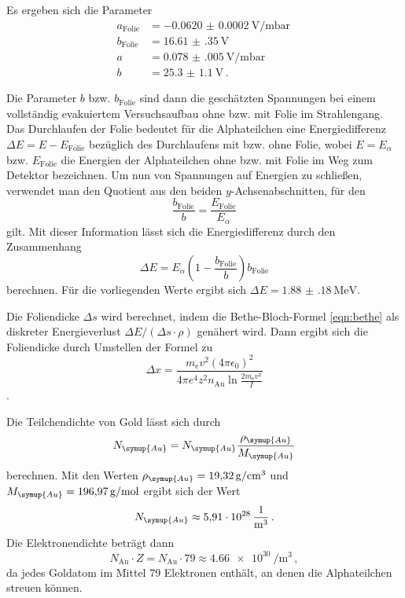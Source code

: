 Es ergeben sich die Parameter
\begin{align*}
  a_{\text{Folie}}&=\SI{-0.0620(002)}{\volt\per\milli\bar} \, \\
  b_{\text{Folie}}&=\SI{16.61(35)}{\volt} \,\\
  a&=\SI{0.078(005)}{\volt\per\milli\bar} \, \\
  b&=\SI{25.3(11)}{\volt} \,.
\end{align*}

Die Parameter $b$ bzw. $b_{\text{Folie}}$ sind dann die geschätzten Spannungen bei einem vollständig evakuiertem Versuchsaufbau ohne bzw. mit Folie im Strahlengang.
Das Durchlaufen der Folie bedeutet für die Alphateilchen eine Energiedifferenz $\Delta E = E-E_{\text{Folie}}$ bezüglich des Durchlaufens mit bzw. ohne Folie, wobei $E = E_\alpha$ bzw. $E_{\text{Folie}}$ die Energien der Alphateilchen ohne bzw. mit Folie im Weg zum Detektor bezeichnen.
Um nun von Spannungen auf Energien zu schließen, verwendet man den Quotient aus den beiden $y$-Achsenabschnitten, für den
\begin{equation*}
  \frac{b_{\text{Folie}}}{b} = \frac{E_{\text{Folie}}}{E_\alpha}
\end{equation*}
gilt. Mit dieser Information lässt sich die Energiedifferenz durch den Zusammenhang
\begin{equation*}
  \Delta E = E_\alpha \left( 1 - \frac{b_{\text{Folie}}}{b} \right)b_{\text{Folie}}
\end{equation*}
berechnen. Für die vorliegenden Werte ergibt sich $\Delta E = \SI{1.88(18)}{\mega\electronvolt}$.

Die Foliendicke $\Delta s$ wird berechnet, indem die Bethe-Bloch-Formel \eqref{eqn:bethe} als diskreter Energieverlust $\Delta E/(\Delta s \cdot \rho)$ genähert wird.
Dann ergibt sich die Foliendicke durch Umstellen der Formel zu
\begin{equation*}
  \Delta x =
  \frac{m_{\mathrm{e}} v^2(4 \pi \epsilon_{\mathrm{0}})^2}
  {4\pi e^4 z^2 n_\text{Au} \ln{\frac{2 m_{\mathrm{e}} v^2}{I}}}
\end{equation*}.

Die Teilchendichte von Gold lässt sich durch
\begin{equation*}
  N_{\symup{Au}} = N_{\symup{Au}} \frac{\rho_{\symup{Au}}}{M_{\symup{Au}}}
\end{equation*}
berechnen. Mit den Werten $\rho_{\symup{Au}}=\SI{19.32}{\gram\per\cubic\centi\metre}$ \cite{rho}
und ${M_{\symup{Au}}}=\SI{196.97}{\gram\per\mol}$ \cite{molmasse}
ergibt sich der Wert
\begin{equation*}
  N_{\symup{Au}} \approx \SI{5.91e28}{\per\cubic\metre}\,.
\end{equation*}
Die Elektronendichte beträgt dann
\begin{equation}
  N_\text{Au} \cdot Z = N_\text{Au} \cdot 79 \approx \SI{4.66e30}{\per\cubic\metre}\,,
\end{equation}
da jedes Goldatom im Mittel 79 Elektronen enthält, an denen die Alphateilchen streuen können.

